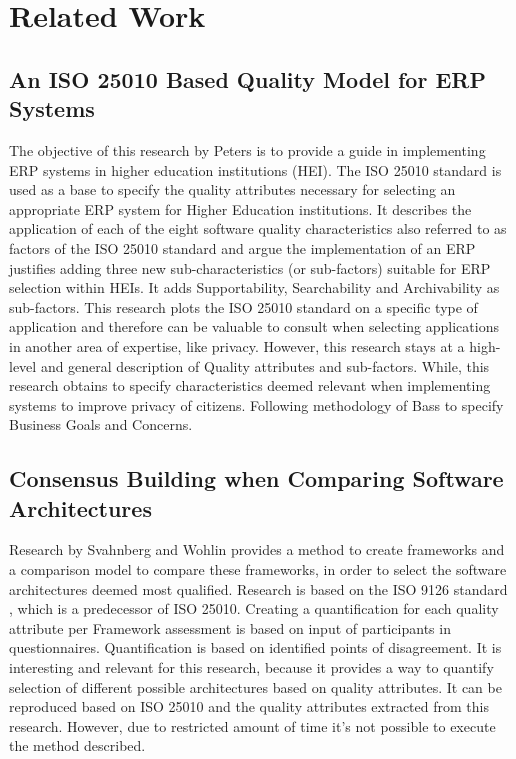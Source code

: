 \chapter{Related Work}\label{s:related}


\section*{An ISO 25010 Based Quality Model for ERP Systems}
The objective of this research by Peters \etal \cite{Peters2020AnI2} is to provide a guide in implementing ERP systems in higher education institutions (HEI). The ISO 25010 standard is used as a base to specify the quality attributes necessary for selecting an appropriate ERP system for Higher Education institutions. It describes the application of each of the eight software quality characteristics also referred to as factors of the ISO 25010 standard and argue the implementation of an ERP justifies adding three new sub-characteristics (or sub-factors) suitable for ERP selection within HEIs. It adds Supportability, Searchability and Archivability as sub-factors. This research plots the ISO 25010 standard on a specific type of application and therefore can be valuable to consult when selecting applications in another area of expertise, like privacy. However, this research stays at a high-level and general description of Quality attributes and sub-factors. While, this research obtains to specify characteristics deemed relevant when implementing systems to improve privacy of citizens. Following methodology of Bass \etal \cite{Bass2015SoftwareAI} to specify Business Goals and Concerns. 

\section*{Consensus Building when Comparing Software Architectures}
Research by Svahnberg and Wohlin \cite{Svahnberg2002ConsensusBW} provides a method to create frameworks and a comparison model to compare these frameworks, in order to select the software architectures deemed most qualified. Research is based on the ISO 9126 standard \cite{ISO9126}, which is a predecessor of ISO 25010. Creating a quantification for each quality attribute per Framework assessment is based on input of participants in questionnaires. Quantification is based on identified points of disagreement. It is interesting and relevant for this research, because it provides a way to quantify selection of different possible architectures based on quality attributes. It can be reproduced based on ISO 25010 and the quality attributes extracted from this research. However, due to restricted amount of time it's not possible to execute the method described.


